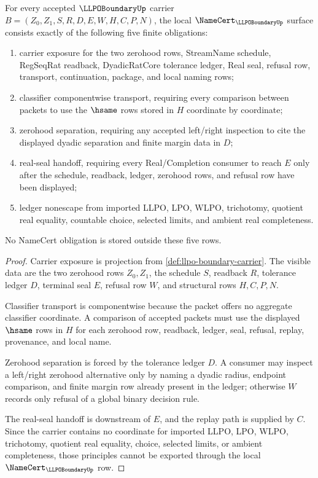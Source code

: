 \begin{theorem}
\label{thm:llpo-boundary-namecert-obligations}
For every accepted $\LLPOBoundaryUp$ carrier $B=(Z_0,Z_1,S,R,D,E,W,H,C,P,N)$, the local $\NameCert_{\LLPOBoundaryUp}$ surface consists exactly of the following five finite obligations:
\begin{enumerate}
\item carrier exposure for the two zerohood rows, StreamName schedule, RegSeqRat readback, DyadicRatCore tolerance ledger, Real seal, refusal row, transport, continuation, package, and local naming rows;
\item classifier componentwise transport, requiring every comparison between packets to use the $\hsame$ rows stored in $H$ coordinate by coordinate;
\item zerohood separation, requiring any accepted left/right inspection to cite the displayed dyadic separation and finite margin data in $D$;
\item real-seal handoff, requiring every Real/Completion consumer to reach $E$ only after the schedule, readback, ledger, zerohood rows, and refusal row have been displayed;
\item ledger nonescape from imported LLPO, LPO, WLPO, trichotomy, quotient real equality, countable choice, selected limits, and ambient real completeness.
\end{enumerate}
No NameCert obligation is stored outside these five rows.
\end{theorem}
\begin{proof}
Carrier exposure is projection from \autoref{def:llpo-boundary-carrier}. The visible data are the two zerohood rows $Z_0,Z_1$, the schedule $S$, readback $R$, tolerance ledger $D$, terminal seal $E$, refusal row $W$, and structural rows $H,C,P,N$.

Classifier transport is componentwise because the packet offers no aggregate classifier coordinate. A comparison of accepted packets must use the displayed $\hsame$ rows in $H$ for each zerohood row, readback, ledger, seal, refusal, replay, provenance, and local name.

Zerohood separation is forced by the tolerance ledger $D$. A consumer may inspect a left/right zerohood alternative only by naming a dyadic radius, endpoint comparison, and finite margin row already present in the ledger; otherwise $W$ records only refusal of a global binary decision rule.

The real-seal handoff is downstream of $E$, and the replay path is supplied by $C$. Since the carrier contains no coordinate for imported LLPO, LPO, WLPO, trichotomy, quotient real equality, choice, selected limits, or ambient completeness, those principles cannot be exported through the local $\NameCert_{\LLPOBoundaryUp}$ row.
\end{proof}

